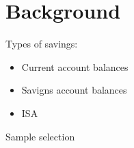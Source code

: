 
\section{Background}%
\label{sec:background}

Types of savings:

\begin{itemize}
    \item Current account balances
    \item Savigns account balances
    \item ISA
\end{itemize}


\begin{table}[ht]
\caption{Sample selection}\label{tab:selection}

\end{table}


